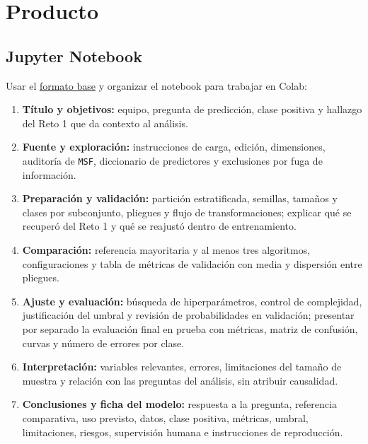 \documentclass[a4,11pt]{aleph-notas}
\begin{document}
\section*{Producto}

\subsection{Jupyter Notebook}
Usar el \href{https://github.com/andres-merino/FormatoBaseProyectos/blob/main/Plantilla.ipynb}{formato base} y organizar el notebook para trabajar en Colab:

\begin{enumerate}[leftmargin=*, label={\textbf{\arabic*.}}]
    \item \textbf{Título y objetivos:} equipo, pregunta de predicción, clase positiva y hallazgo del Reto 1 que da contexto al análisis.

    \item \textbf{Fuente y exploración:} instrucciones de carga, edición, dimensiones, auditoría de \texttt{MSF}, diccionario de predictores y exclusiones por fuga de información.

    \item \textbf{Preparación y validación:} partición estratificada, semillas, tamaños y clases por subconjunto, pliegues y flujo de transformaciones; explicar qué se recuperó del Reto 1 y qué se reajustó dentro de entrenamiento.

    \item \textbf{Comparación:} referencia mayoritaria y al menos tres algoritmos, configuraciones y tabla de métricas de validación con media y dispersión entre pliegues.

    \item \textbf{Ajuste y evaluación:} búsqueda de hiperparámetros, control de complejidad, justificación del umbral y revisión de probabilidades en validación; presentar por separado la evaluación final en prueba con métricas, matriz de confusión, curvas y número de errores por clase.

    \item \textbf{Interpretación:} variables relevantes, errores, limitaciones del tamaño de muestra y relación con las preguntas del análisis, sin atribuir causalidad.

    \item \textbf{Conclusiones y ficha del modelo:} respuesta a la pregunta, referencia comparativa, uso previsto, datos, clase positiva, métricas, umbral, limitaciones, riesgos, supervisión humana e instrucciones de reproducción.
\end{enumerate}
\end{document}
